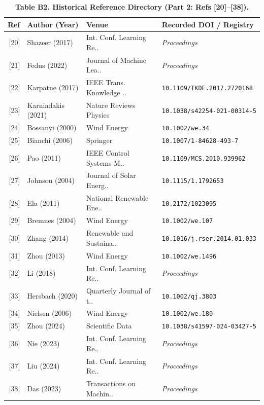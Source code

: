 \documentclass[
  journal]{IEEEtran}
\begin{document}
\begin{table}[!t]
\centering
\fontsize{8.0pt}{9.6pt}\selectfont
\setlength{\tabcolsep}{4pt}
\renewcommand{\arraystretch}{1.05}
\caption*{\textbf{Table B2. Historical Reference Directory (Part 2: Refs [20]--[38]).}}
%
\setlength{\tabcolsep}{4pt}
\begin{tabular}{rlll}
\toprule
\textbf{Ref} & \textbf{Author (Year)} & \textbf{Venue} & \textbf{Recorded DOI / Registry} \\
\midrule
{[20]} & Shazeer (2017) & Int. Conf. Learning Re.. & \textit{Proceedings} \\
{[21]} & Fedus (2022) & Journal of Machine Lea.. & \textit{Proceedings} \\
{[22]} & Karpatne (2017) & IEEE Trans. Knowledge .. & \texttt{10.1109/TKDE.2017.2720168} \\
{[23]} & Karniadakis (2021) & Nature Reviews Physics & \texttt{10.1038/s42254-021-00314-5} \\
{[24]} & Bossanyi (2000) & Wind Energy & \texttt{10.1002/we.34} \\
{[25]} & Bianchi (2006) & Springer & \texttt{10.1007/1-84628-493-7} \\
{[26]} & Pao (2011) & IEEE Control Systems M.. & \texttt{10.1109/MCS.2010.939962} \\
{[27]} & Johnson (2004) & Journal of Solar Energ.. & \texttt{10.1115/1.1792653} \\
{[28]} & Ela (2011) & National Renewable Ene.. & \texttt{10.2172/1023095} \\
{[29]} & Bremnes (2004) & Wind Energy & \texttt{10.1002/we.107} \\
{[30]} & Zhang (2014) & Renewable and Sustaina.. & \texttt{10.1016/j.rser.2014.01.033} \\
{[31]} & Zhou (2013) & Wind Energy & \texttt{10.1002/we.1496} \\
{[32]} & Li (2018) & Int. Conf. Learning Re.. & \textit{Proceedings} \\
{[33]} & Hersbach (2020) & Quarterly Journal of t.. & \texttt{10.1002/qj.3803} \\
{[34]} & Nielsen (2006) & Wind Energy & \texttt{10.1002/we.180} \\
{[35]} & Zhou (2024) & Scientific Data & \texttt{10.1038/s41597-024-03427-5} \\
{[36]} & Nie (2023) & Int. Conf. Learning Re.. & \textit{Proceedings} \\
{[37]} & Liu (2024) & Int. Conf. Learning Re.. & \textit{Proceedings} \\
{[38]} & Das (2023) & Transactions on Machin.. & \textit{Proceedings} \\
\bottomrule
\end{tabular}
\end{table}
\end{document}
